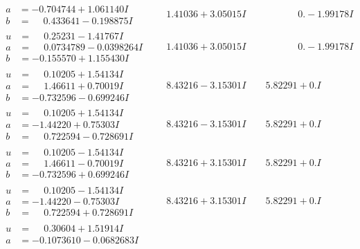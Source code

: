 \documentclass[1p]{elsarticle_modified}
\theoremstyle{definition}
\begin{document}
$$\begin{array}{c|c|c}
\begin{aligned}
a &= -0.704744 + 1.061140 I \\
b &= \phantom{-}0.433641 - 0.198875 I\end{aligned}
 & \phantom{-}1.41036 + 3.05015 I & \phantom{-0.000000 } 0. - 1.99178 I \\ \hline\begin{aligned}
u &= \phantom{-}0.25231 - 1.41767 I \\
a &= \phantom{-}0.0734789 - 0.0398264 I \\
b &= -0.155570 + 1.155430 I\end{aligned}
 & \phantom{-}1.41036 + 3.05015 I & \phantom{-0.000000 } 0. - 1.99178 I \\ \hline\begin{aligned}
u &= \phantom{-}0.10205 + 1.54134 I \\
a &= \phantom{-}1.46611 + 0.70019 I \\
b &= -0.732596 - 0.699246 I\end{aligned}
 & \phantom{-}8.43216 - 3.15301 I & \phantom{-}5.82291 + 0. I\phantom{ +0.000000I} \\ \hline\begin{aligned}
u &= \phantom{-}0.10205 + 1.54134 I \\
a &= -1.44220 + 0.75303 I \\
b &= \phantom{-}0.722594 - 0.728691 I\end{aligned}
 & \phantom{-}8.43216 - 3.15301 I & \phantom{-}5.82291 + 0. I\phantom{ +0.000000I} \\ \hline\begin{aligned}
u &= \phantom{-}0.10205 - 1.54134 I \\
a &= \phantom{-}1.46611 - 0.70019 I \\
b &= -0.732596 + 0.699246 I\end{aligned}
 & \phantom{-}8.43216 + 3.15301 I & \phantom{-}5.82291 + 0. I\phantom{ +0.000000I} \\ \hline\begin{aligned}
u &= \phantom{-}0.10205 - 1.54134 I \\
a &= -1.44220 - 0.75303 I \\
b &= \phantom{-}0.722594 + 0.728691 I\end{aligned}
 & \phantom{-}8.43216 + 3.15301 I & \phantom{-}5.82291 + 0. I\phantom{ +0.000000I} \\ \hline\begin{aligned}
u &= \phantom{-}0.30604 + 1.51914 I \\
a &= -0.1073610 - 0.0682683 I \\

\end{aligned}
\end{array}$$
\end{document}
